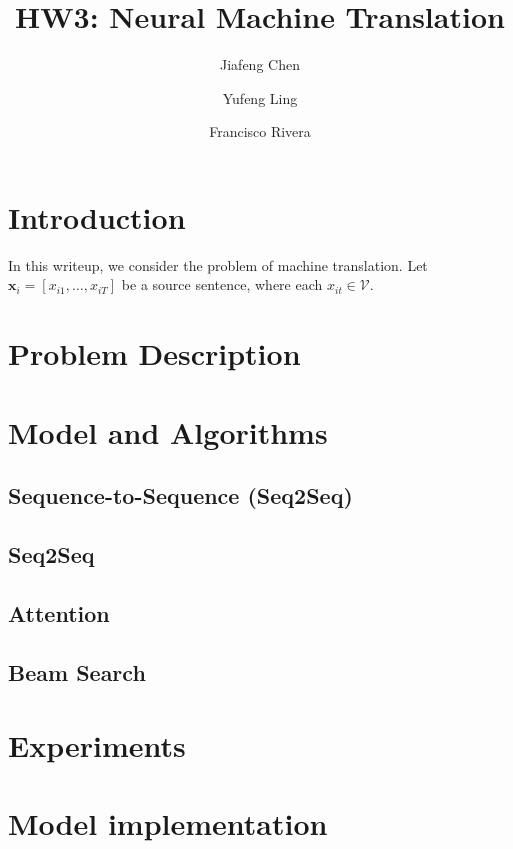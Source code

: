 \documentclass[12pt]{article}
\title{HW3: Neural Machine Translation}
\author{Jiafeng Chen \and Yufeng Ling \and
Francisco Rivera}
\newcommand{\sts}{Seq2Seq}
\begin{document}
\maketitle
\section{Introduction}
In this writeup, we consider the problem of machine translation. Let $\bm x_i = [x_{i1},\ldots,x_{iT}]$ be a source sentence, where each $x_{it} \in \mathcal V$.  

\section{Problem Description}

\section{Model and Algorithms}

\subsection{Sequence-to-Sequence (\sts)}
\subsection{Seq2Seq}
\label{sub:seq2seq}

\subsection{Attention}
\label{sub:attn}

\subsection{Beam Search}
\label{sub:beam}


\section{Experiments}





\appendix
\section{Model implementation}
\end{document}
